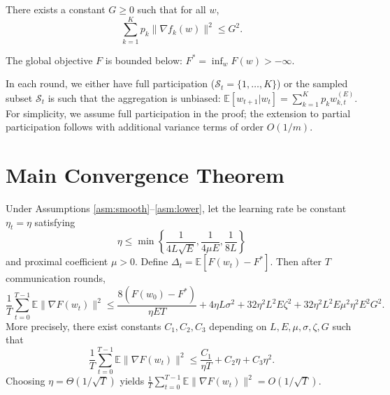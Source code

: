 \documentclass{article}
\begin{document}
\begin{assumption} \label{asm:dissimilarity}
    There exists a constant $G \geq 0$ such that for all $w$,
    \begin{equation}
        \sum_{k=1}^K p_k \| \nabla f_k(w) \|^2 \leq G^2.
    \end{equation}
\end{assumption}

\begin{assumption} \label{asm:lower}
    The global objective $F$ is bounded below: $F^* = \inf_w F(w) > -\infty$.
\end{assumption}

\begin{assumption} \label{asm:sampling}
    In each round, we either have full participation ($\mathcal{S}_t = \{1,\dots,K\}$) or the sampled subset $\mathcal{S}_t$ is such that the aggregation is unbiased: $\mathbb{E}[w_{t+1} | w_t] = \sum_{k=1}^K p_k w_{k,t}^{(E)}$. For simplicity, we assume full participation in the proof; the extension to partial participation follows with additional variance terms of order $O(1/m)$.
\end{assumption}

\section*{Main Convergence Theorem}

\begin{theorem} \label{thm:main}
    Under Assumptions \ref{asm:smooth}--\ref{asm:lower}, let the learning rate be constant $\eta_t = \eta$ satisfying
    \begin{equation}
        \eta \leq \min\left\{ \frac{1}{4L\sqrt{E}}, \frac{1}{4\mu E}, \frac{1}{8L} \right\}
    \end{equation}
    and proximal coefficient $\mu > 0$. Define $\Delta_t = \mathbb{E}[F(w_t) - F^*]$. Then after $T$ communication rounds,
    \begin{equation}
        \frac{1}{T} \sum_{t=0}^{T-1} \mathbb{E} \| \nabla F(w_t) \|^2 \leq \frac{8(F(w_0) - F^*)}{\eta E T} + 4\eta L \sigma^2 + 32 \eta^2 L^2 E \zeta^2 + 32 \eta^2 L^2 E \mu^2 \eta^2 E^2 G^2.
    \end{equation}
    More precisely, there exist constants $C_1, C_2, C_3$ depending on $L, E, \mu, \sigma, \zeta, G$ such that
    \begin{equation}
        \frac{1}{T} \sum_{t=0}^{T-1} \mathbb{E} \| \nabla F(w_t) \|^2 \leq \frac{C_1}{\eta T} + C_2 \eta + C_3 \eta^2.
    \end{equation}
    Choosing $\eta = \Theta(1/\sqrt{T})$ yields $\frac{1}{T} \sum_{t=0}^{T-1} \mathbb{E} \| \nabla F(w_t) \|^2 = O(1/\sqrt{T})$.
\end{theorem}
\end{document}
